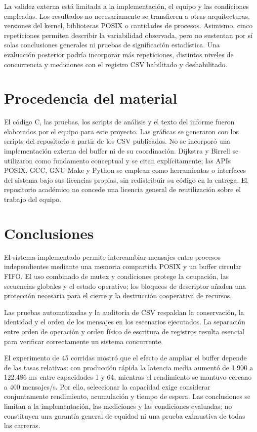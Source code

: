 \documentclass[conference]{IEEEtran}
\begin{document}
La validez externa está limitada a la implementación, el equipo y las condiciones empleadas. Los resultados no necesariamente se transfieren a otras arquitecturas, versiones del kernel, bibliotecas POSIX o cantidades de procesos. Asimismo, cinco repeticiones permiten describir la variabilidad observada, pero no sustentan por sí solas conclusiones generales ni pruebas de significación estadística. Una evaluación posterior podría incorporar más repeticiones, distintos niveles de concurrencia y mediciones con el registro CSV habilitado y deshabilitado.

\section{Procedencia del material}
El código C, las pruebas, los scripts de análisis y el texto del informe fueron elaborados por el equipo para este proyecto. Las gráficas se generaron con los scripts del repositorio a partir de los CSV publicados. No se incorporó una implementación externa del buffer ni de su coordinación. Dijkstra y Birrell se utilizaron como fundamento conceptual y se citan explícitamente; las APIs POSIX, GCC, GNU Make y Python se emplean como herramientas o interfaces del sistema bajo sus licencias propias, sin redistribuir su código en la entrega. El repositorio académico no concede una licencia general de reutilización sobre el trabajo del equipo.


\section{Conclusiones}
El sistema implementado permite intercambiar mensajes entre procesos independientes mediante una memoria compartida POSIX y un buffer circular FIFO. El uso combinado de mutex y condiciones protege la ocupación, las secuencias globales y el estado operativo; los bloqueos de descriptor añaden una protección necesaria para el cierre y la destrucción cooperativa de recursos.\par
Las pruebas automatizadas y la auditoría de CSV respaldan la conservación, la identidad y el orden de los mensajes en los escenarios ejecutados. La separación entre orden de operación y orden físico de escritura de registros resulta esencial para verificar correctamente un sistema concurrente.\par
El experimento de 45 corridas mostró que el efecto de ampliar el buffer depende de las tasas relativas: con producción rápida la latencia media aumentó de 1.900 a 122.486 ms entre capacidades 1 y 64, mientras el rendimiento se mantuvo cercano a 400 mensajes/s. Por ello, seleccionar la capacidad exige considerar conjuntamente rendimiento, acumulación y tiempo de espera. Las conclusiones se limitan a la implementación, las mediciones y las condiciones evaluadas; no constituyen una garantía general de equidad ni una prueba exhaustiva de todas las carreras.
\end{document}
